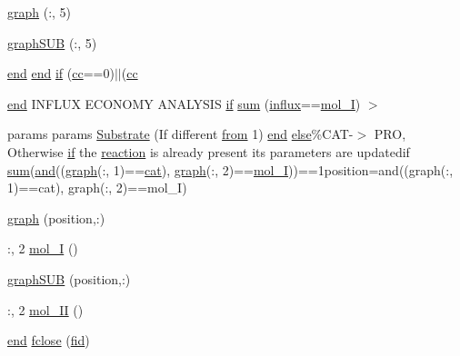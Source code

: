 \begin{DoxyCompactItemize}
\item 
\hyperlink{a00022_a06db733746591db2e7af550e39737769}{graph} (\-:, 5)
\item 
\hyperlink{a00022_a0dcc86024488689bb64656babb50789c}{graph\-S\-U\-B} (\-:, 5)
\item 
\hyperlink{a00019_afb358f48b1646c750fb9da6c6585be2b}{end} \hyperlink{a00019_afb358f48b1646c750fb9da6c6585be2b}{end} \hyperlink{a00022_a69389e83631699e80408490e48a695b0}{if} (\hyperlink{a00022_afb5980388a6e55ca55437b53cdaf528a}{cc}==0)$|$$|$(\hyperlink{a00022_afb5980388a6e55ca55437b53cdaf528a}{cc}
\item 
\hyperlink{a00019_afb358f48b1646c750fb9da6c6585be2b}{end} I\-N\-F\-L\-U\-X E\-C\-O\-N\-O\-M\-Y A\-N\-A\-L\-Y\-S\-I\-S \hyperlink{a00024_a01d55766b8058903dd360b4bda71f9f5}{if} \hyperlink{a00022_a576bebae86b11914280920c448def53d}{sum} (\hyperlink{a00059_a902e747aeec6b345d3a057099152f41f}{influx}==\hyperlink{a00022_ab346189eef5359a07ba32144ddcd4465}{mol\-\_\-\-I}) $>$
\item 
params params \hyperlink{a00022_a933446706261d8afb3d9cb88a769aa2b}{Substrate} (If different \hyperlink{a00022_aa7b4fe13e75a69fca72862effeaf6196}{from} 1) \hyperlink{a00019_afb358f48b1646c750fb9da6c6585be2b}{end} \hyperlink{a00025_af5946383720aa572eb93e1e63afc23c2}{else}\%C\-A\-T-\/$>$ P\-R\-O, Otherwise \hyperlink{a00024_a01d55766b8058903dd360b4bda71f9f5}{if} the \hyperlink{a00022_a4ba2ecb46f808729569ecce2cc1d34c6}{reaction} is already present its parameters are updatedif \hyperlink{a00058_a59a869fb2b28d56dacd91c09e1dffc8d}{sum}(\hyperlink{a00022_a170f8acb213f91bf71c77b1d20bceb33}{and}((\hyperlink{a00022_a2745e24fec2a44d51f4452beb1596bd3}{graph}(\-:, 1)==\hyperlink{a00022_a7073f71a43389f3032e69b1fffc2551a}{cat}), \hyperlink{a00022_a2745e24fec2a44d51f4452beb1596bd3}{graph}(\-:, 2)==\hyperlink{a00022_ab346189eef5359a07ba32144ddcd4465}{mol\-\_\-\-I}))==1position=and((graph(\-:, 1)==cat), graph(\-:, 2)==mol\-\_\-\-I)
\item 
\hyperlink{a00022_a2745e24fec2a44d51f4452beb1596bd3}{graph} (position,\-:)
\item 
\-:, 2 \hyperlink{a00022_ab346189eef5359a07ba32144ddcd4465}{mol\-\_\-\-I} ()
\item 
\hyperlink{a00022_acd499d32ebba9c935bab9a19da7a174b}{graph\-S\-U\-B} (position,\-:)
\item 
\-:, 2 \hyperlink{a00022_a4d2c086887289f8900b38ffa56854da3}{mol\-\_\-\-I\-I} ()
\item 
\hyperlink{a00019_afb358f48b1646c750fb9da6c6585be2b}{end} \hyperlink{a00022_a5f84f51058cdb4f43c29d2c875659f42}{fclose} (\hyperlink{a00025_ae9011d40c6f13e68e6f07156e0da7c5d}{fid})
$$
\end{DoxyCompactItemize}
